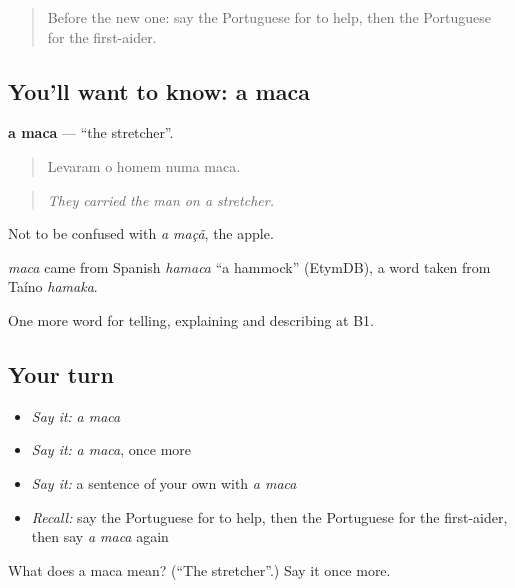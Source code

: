 \label{lesson:PT-C305-maca}



\begin{quote}
Before the new one: say the Portuguese for to help, then the Portuguese for the first-aider.
\end{quote}

\subsection*{You'll want to know: a maca}
\textbf{a maca} — \textquotedblleft{}the stretcher\textquotedblright{}.

\begin{quote}
Levaram o homem numa maca.
\end{quote}

\begin{quote}
\emph{They carried the man on a stretcher.}
\end{quote}

Not to be confused with \emph{a maçã}, the apple.

\begin{cousinweb}
\emph{maca} came from Spanish \emph{hamaca} \textquotedblleft{}a hammock\textquotedblright{} (EtymDB), a word taken from Taíno \emph{hamaka}.
\end{cousinweb}

\begin{grammarlens}[title={What you've built}]
One more word for telling, explaining and describing at B1.
\end{grammarlens}

\subsection*{Your turn}
\begin{itemize}
\raggedright
  \item \emph{Say it:} \emph{a maca}
  \item \emph{Say it:} \emph{a maca}, once more
  \item \emph{Say it:} a sentence of your own with \emph{a maca}
  \item \emph{Recall:} say the Portuguese for to help, then the Portuguese for the first-aider, then say \emph{a maca} again
\end{itemize}

\begin{tcolorbox}[breakable,colback=teal!4,colframe=teal!35!black,title={Before you move on}]
What does a maca mean? (\textquotedblleft{}The stretcher\textquotedblright{}.) Say it once more.
\end{tcolorbox}
